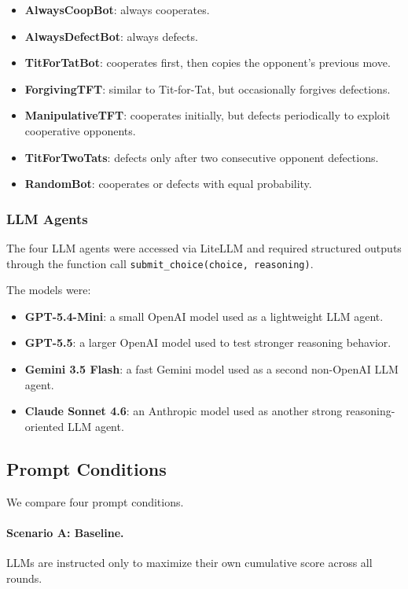 \documentclass[11pt]{article}
\begin{document}
\begin{itemize}
\item \textbf{AlwaysCoopBot}: always cooperates.
\item \textbf{AlwaysDefectBot}: always defects.
\item \textbf{TitForTatBot}: cooperates first, then copies the opponent's previous move.
\item \textbf{ForgivingTFT}: similar to Tit-for-Tat, but occasionally forgives defections.
\item \textbf{ManipulativeTFT}: cooperates initially, but defects periodically to exploit cooperative opponents.
\item \textbf{TitForTwoTats}: defects only after two consecutive opponent defections.
\item \textbf{RandomBot}: cooperates or defects with equal probability.
\end{itemize}

\subsubsection{LLM Agents}

The four LLM agents were accessed via LiteLLM and required structured outputs through the function call \texttt{submit\_choice(choice, reasoning)}.

The models were:

\begin{itemize}
\item \textbf{GPT-5.4-Mini}: a small OpenAI model used as a lightweight LLM agent.
\item \textbf{GPT-5.5}: a larger OpenAI model used to test stronger reasoning behavior.
\item \textbf{Gemini 3.5 Flash}: a fast Gemini model used as a second non-OpenAI LLM agent.
\item \textbf{Claude Sonnet 4.6}: an Anthropic model used as another strong reasoning-oriented LLM agent.
\end{itemize}

\subsection{Prompt Conditions}

We compare four prompt conditions.

\paragraph{Scenario A: Baseline.}
LLMs are instructed only to maximize their own cumulative score across all rounds.
\end{document}
